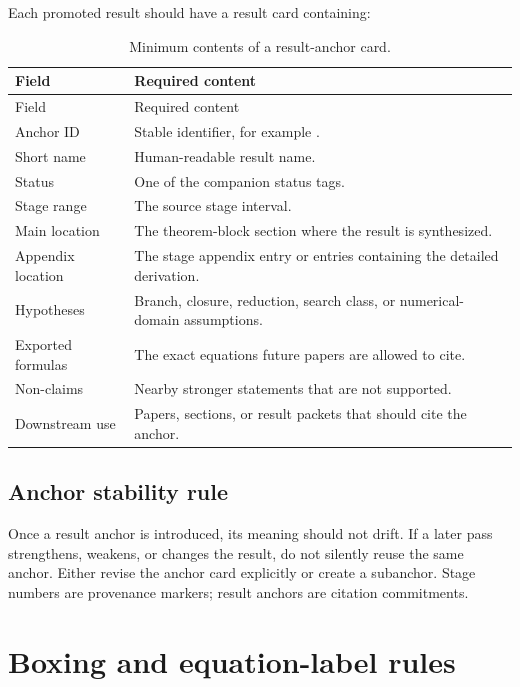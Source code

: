Each promoted result should have a result card containing:

\begin{longtable}{@{}L{0.22\textwidth}L{0.68\textwidth}@{}}
\caption{Minimum contents of a result-anchor card.}\label{tab:anchor-card-requirements}\\
\toprule
Field & Required content \\
\midrule
\endfirsthead
\toprule
Field & Required content \\
\midrule
\endhead
Anchor ID & Stable identifier, for example . \\
\addlinespace
Short name & Human-readable result name. \\
\addlinespace
Status & One of the companion status tags. \\
\addlinespace
Stage range & The source stage interval. \\
\addlinespace
Main location & The theorem-block section where the result is synthesized. \\
\addlinespace
Appendix location & The stage appendix entry or entries containing the detailed derivation. \\
\addlinespace
Hypotheses & Branch, closure, reduction, search class, or numerical-domain assumptions. \\
\addlinespace
Exported formulas & The exact equations future papers are allowed to cite. \\
\addlinespace
Non-claims & Nearby stronger statements that are not supported. \\
\addlinespace
Downstream use & Papers, sections, or result packets that should cite the anchor. \\
\bottomrule
\end{longtable}

\subsection{Anchor stability rule}
\label{subsec:anchor-stability-rule}

Once a result anchor is introduced, its meaning should not drift.  If a later pass strengthens, weakens, or changes the result, do not silently reuse the same anchor.  Either revise the anchor card explicitly or create a subanchor.  Stage numbers are provenance markers; result anchors are citation commitments.

\section{Boxing and equation-label rules}
\label{sec:boxing-and-equation-label-rules}

